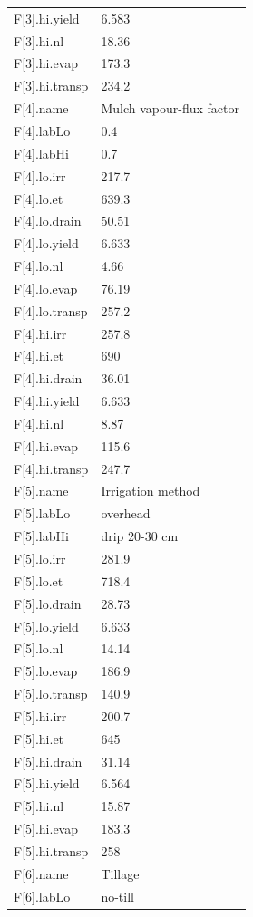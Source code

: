 {\begin{longtable}{p{}p{}}
{}F[3].hi.yield & 6.583\\
{}F[3].hi.nl & 18.36\\
{}F[3].hi.evap & 173.3\\
{}F[3].hi.transp & 234.2\\
{}F[4].name & Mulch vapour-flux factor\\
{}F[4].labLo & 0.4\\
{}F[4].labHi & 0.7\\
{}F[4].lo.irr & 217.7\\
{}F[4].lo.et & 639.3\\
{}F[4].lo.drain & 50.51\\
{}F[4].lo.yield & 6.633\\
{}F[4].lo.nl & 4.66\\
{}F[4].lo.evap & 76.19\\
{}F[4].lo.transp & 257.2\\
{}F[4].hi.irr & 257.8\\
{}F[4].hi.et & 690\\
{}F[4].hi.drain & 36.01\\
{}F[4].hi.yield & 6.633\\
{}F[4].hi.nl & 8.87\\
{}F[4].hi.evap & 115.6\\
{}F[4].hi.transp & 247.7\\
{}F[5].name & Irrigation method\\
{}F[5].labLo & overhead\\
{}F[5].labHi & drip 20-30 cm\\
{}F[5].lo.irr & 281.9\\
{}F[5].lo.et & 718.4\\
{}F[5].lo.drain & 28.73\\
{}F[5].lo.yield & 6.633\\
{}F[5].lo.nl & 14.14\\
{}F[5].lo.evap & 186.9\\
{}F[5].lo.transp & 140.9\\
{}F[5].hi.irr & 200.7\\
{}F[5].hi.et & 645\\
{}F[5].hi.drain & 31.14\\
{}F[5].hi.yield & 6.564\\
{}F[5].hi.nl & 15.87\\
{}F[5].hi.evap & 183.3\\
{}F[5].hi.transp & 258\\
{}F[6].name & Tillage\\
{}F[6].labLo & no-till\\

\end{longtable}}

